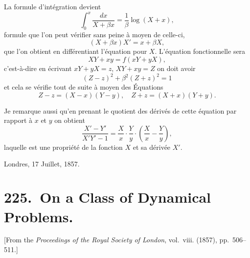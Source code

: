 \documentclass[11pt,a4paper]{book}
\begin{document}
La formule d'int\'{e}gration devient
\[
\int_0^x\frac{dx}{X+\beta x}=\frac{1}{\beta}\log(X+x),
\]
formule que l'on peut v\'{e}rifier sans peine \`{a} moyen de celle-ci,
\[
(X+\beta x)X'=x+\beta X,
\]
que l'on obtient en diff\'{e}rentiant l'\'{e}quation pour $X$. L'\'{e}quation fonctionnelle sera
\[
XY+xy=f(xY+yX),
\]
c'est-\`{a}-dire en \'{e}crivant $xY+yX=z$, $XY+xy=Z$ on doit avoir
\[
(Z-z)^2+\beta^2(Z+z)^2=1
\]
et cela se v\'{e}rifie tout de suite \`{a} moyen des \'{E}quations
\[
Z-z=(X-x)(Y-y),\quad Z+z=(X+x)(Y+y).
\]

Je remarque aussi qu'en prenant le quotient des d\'{e}riv\'{e}s de cette \'{e}quation par rapport \`{a} $x$ et $y$ on obtient
\[
\frac{X'-Y'}{X'Y'-1}=\frac{X}{x}\cdot\frac{Y}{y}\cdot\left(\frac{X}{x}-\frac{Y}{y}\right),
\]
laquelle est une propri\'{e}t\'{e} de la fonction $X$ et sa d\'{e}riv\'{e}e $X'$.

\begin{flushright}
Londres, 17 Juillet, 1857.
\end{flushright}
\newpage

\chapter[On a Class of Dynamical Problems]{225.\ On a Class of Dynamical Problems.}
\label{paper225}

\begin{center}
\small
[From the \textit{Proceedings of the Royal Society of London}, vol.~viii. (1857), pp.~506--511.]
\end{center}

\bigskip
\end{document}
